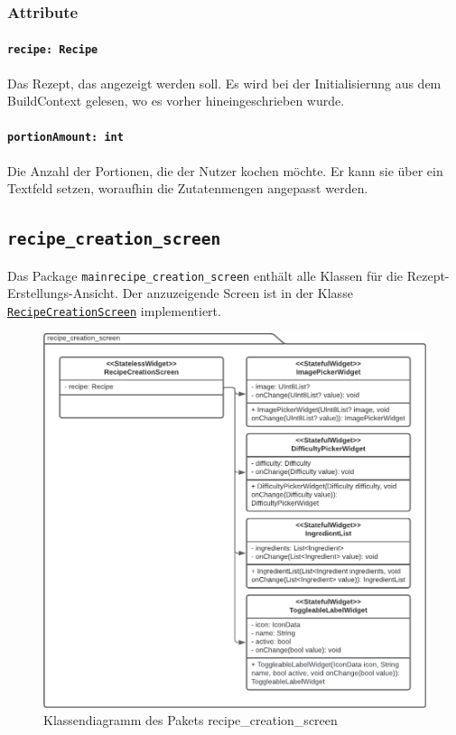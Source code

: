 \documentclass{entwurfsheft}
\begin{document}
\subsubsection*{Attribute}
\paragraph{\texttt{recipe: Recipe}}
Das Rezept, das angezeigt werden soll. Es wird bei der Initialisierung aus dem \Gls{BuildContext} gelesen, wo es vorher hineingeschrieben wurde.
\paragraph{\texttt{portionAmount: int}}
Die Anzahl der Portionen, die der Nutzer kochen möchte. Er kann sie über ein Textfeld setzen, woraufhin die Zutatenmengen angepasst werden.
\newpage

\subsection{\texttt{recipe\_creation\_screen}}
Das Package \texttt{mainrecipe\_creation\_screen} enthält alle Klassen für die Rezept-Erstellungs-Ansicht. Der anzuzeigende Screen ist in der Klasse \hyperref[sec:recipeCreationScreen]{\texttt{RecipeCreationScreen}} implementiert.
\begin{figure}
    [htp]
    \centering
    \includegraphics[width=\textwidth]{images/presentationLayer/classDiagrams/recipeCreationScreenWhole.pdf}
    \caption{Klassendiagramm des Pakets recipe\_creation\_screen}
\end{figure}
\newpage
\end{document}
